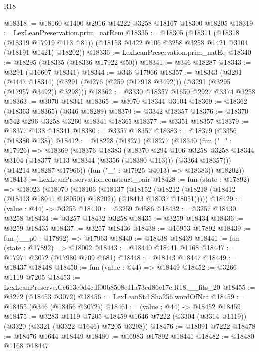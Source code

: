 \begin{lexlean}{R18}
\begin{coremodule}
@18318 := @18160 @1400 @2916 @14222 @3258 @18167 @18300 @18205
@18319 := LexLeanPreservation.prim_natRem
@18335 := @18305
    (@18311
      (@18318 (@18319 @17919 @113 @81))
      (@18153 @1422 @106 @3258 @3258 @1421 @3104 (@18191 @1421) @18202))
@18336 := LexLeanPreservation.prim_natEq
@18340 := @18295 (@18335 (@18336 @17922 @50))
@18341 := @346 @18287
@18343 := @3291 (@16607 @18341)
@18344 := @346 @17966
@18357 := @18343
    (@3291
      (@4447 @18344)
      (@3291 (@4276 (@259 (@17918 @3492))) (@3291 (@3295 (@17957 @3492)) @3298)))
@18362 := @3330 @18357 @1650 @2927 @3374 @3258
@18363 := @3070 @18341
@18365 := @3070 @18344 @3104
@18369 := @18362 (@18363 @18365) (@346 @18289)
@18370 := @3342 @18357
@18376 := @18370 @542 @296 @3258 @3260 @18341 @18365
@18377 := @3351 @18357
@18379 := @18377 @138 @18341
@18380 := @3357 @18357
@18383 := @18379 (@3356 (@18380 @138))
@18412 := @18228
    (@18271
      (@18277
        (@18340
          (fun ("_" : @17926) =>
          @18369
            (@18376
              @18383
              (@18370
                @294
                @106
                @3258
                @3258
                @18344
                @3104
                (@18377 @113 @18344 (@3356 (@18380 @113)))
                (@3364 @18357)))
            (@14214 @18287 @17966))
          (fun ("_" : @17925 @4013) => @18383))
        @18202))
@18413 := LexLeanPreservation.construct_pair
@18428 := fun (state : @17892) =>
  @18023
    (@18070
      (@18106
        (@18137
          (@18152
            (@18212 (@18218 (@18412 (@18413 @18041 @18050)) @18202))
            (@18413 @18037 @18051)))))
@18429 := (value : @44) -> @3255
@18430 := @3259 @4586
@18432 := @3257 @18430 @3258
@18434 := @3257 @18432 @3258
@18435 := @3259 @18434
@18436 := @3259 @18435
@18437 := @3257 @18436
@18438 := @16953 @17892
@18439 := fun (__p0 : @17892) => @17963
@18440 := @18438 @18439
@18441 := fun (state : @17892) => @18002
@18443 := @18440 @18441 @1168
@18447 := @17971 @3072 (@17980 @709 @681)
@18448 := @18443 @18447
@18449 := @18437 @18448
@18450 := fun (value : @44) => @18449
@18452 := @3266 @1119 @7205
@18453 := LexLeanPreserve.Cc613c0d4cdf00b8508ed1a73cd86e17c.R18.__fits_20
@18455 := @3272 (@18453 @3072)
@18456 := LexLeanStd.Sha256.wordOfNat
@18459 := @18455 (@346 (@18456 @3072))
@18461 := (value : @44) -> @18452 @18459
@18475 := @3283
    @1119
    @7205
    @18459
    @1646
    @7222
    (@3304 (@3314 @1119))
    (@3320 (@3321 (@3322 @1646) @7205 @3298))
@18476 := @18091 @7222
@18478 := @18476 @1644 @18449
@18480 := @16983 @17892 @18441
@18482 := @18480 @1168 @18447

\end{coremodule}
\end{lexlean}

